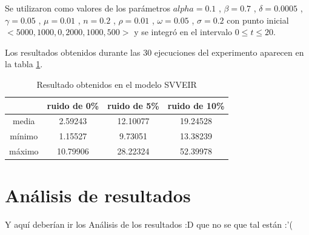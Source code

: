 Se utilizaron como valores de los parámetros $alpha = 0.1$ , $\beta = 0.7$ , $\delta = 0.0005$ , $\gamma = 0.05$ , $\mu = 0.01$ , $n = 0.2$ , $\rho = 0.01$ , $\omega = 0.05$ , $\sigma = 0.2$ con punto inicial $<5000, 1000, 0, 2000, 1000, 500>$ y se integró en el intervalo $0 \leq t \leq 20$.

Los resultados obtenidos durante las 30 ejecuciones del experimento aparecen en la tabla \ref{table:experiment_SVVEIR}.

\begin{table}[!h]
    \centering
    \caption{Resultado obtenidos en el modelo SVVEIR}
    \begin{tabular}{|c|c|c|c|}
        \hline
               & \textbf{ruido de 0\%} & \textbf{ruido de 5\%} & \textbf{ruido de 10\%} \\
        \hline
        media  & 2.59243               & 12.10077              & 19.24528               \\
        \hline
        mínimo & 1.15527               & 9.73051               & 13.38239               \\
        \hline
        máximo & 10.79906              & 28.22324              & 52.39978               \\
        \hline
    \end{tabular}
    \label{table:experiment_SVVEIR}
\end{table}

\section{Análisis de resultados}

Y aquí deberían ir los Análisis de los resultados :D que no se que tal están :'(
